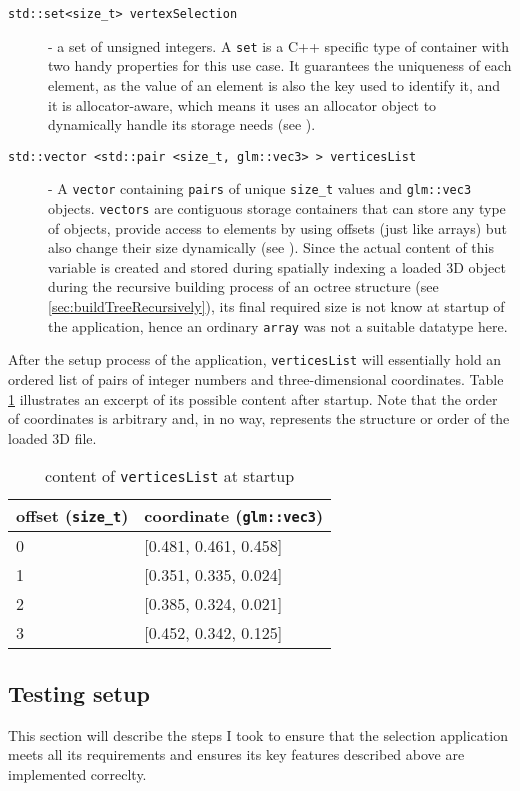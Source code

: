 \begin{description}
	\item[\texttt{std::set<size\_t> vertexSelection}] - a set of unsigned integers. A \texttt{set} is a C++ specific type of container with two handy properties for this use case. It guarantees the uniqueness of each element, as the value of an element is also the key used to identify it, and it is allocator-aware, which means it uses an allocator object to dynamically handle its storage needs (see \cite{set}).
	\item[\texttt{std::vector <std::pair <size\_t, glm::vec3> >  verticesList}] - A \texttt{vector} containing \texttt{pairs} of unique \texttt{size\_t} values and \texttt{glm::vec3} objects. \texttt{vectors} are contiguous storage containers that can store any type of objects, provide access to elements by using offsets (just like arrays) but also change their size dynamically (see \cite{vector}). Since the actual content of this variable is created and stored during spatially indexing a loaded 3D object during the recursive building process of an octree structure (see \ref{sec:buildTreeRecursively}), its final required size is not know at startup of the application, hence an ordinary \texttt{array} was not a suitable datatype here.
\end{description}

After the setup process of the application, \texttt{verticesList} will essentially hold an ordered list of pairs of integer numbers and three-dimensional coordinates. Table \ref{tab:verticesList-startup} illustrates an excerpt of its possible content after startup. Note that the order of coordinates is arbitrary and, in no way, represents the structure or order of the loaded 3D file.



\begin{table}[]
\centering
	\begin{tabular}{l|l}
	offset (\texttt{size\_t}) & coordinate (\texttt{glm::vec3}) \\ \hline
	0 & [0.481, 0.461, 0.458] \\
	1 & [0.351, 0.335, 0.024] \\
	2 & [0.385, 0.324, 0.021] \\
	3 & [0.452, 0.342, 0.125]
	\end{tabular}
	\caption{content of \texttt{verticesList} at startup}
	\label{tab:verticesList-startup}
\end{table}


\subsection{Testing setup}
\label{sec:testing_setup}
This section will describe the steps I took to ensure that the selection application meets all its requirements and ensures its key features described above are implemented correclty.


